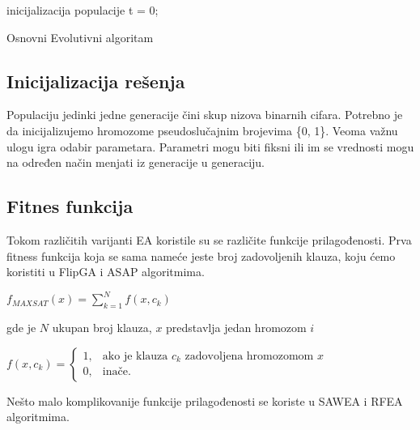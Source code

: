 \documentclass{article}
\begin{document}
\begin{algorithm}[H]
\SetAlgoLined
{}

\BlankLine
 inicijalizacija populacije\;
 t = 0; \\
\caption{Osnovni Evolutivni algoritam}
\end{algorithm}

\subsection{Inicijalizacija rešenja}
\label{sec:ea_init}

Populaciju jedinki jedne generacije čini skup nizova binarnih cifara.
Potrebno je da inicijalizujemo hromozome pseudoslučajnim brojevima \{0, 1\}. Veoma važnu ulogu igra odabir parametara.  Parametri mogu biti fiksni ili im se vrednosti mogu na određen način menjati iz generacije u generaciju.

\subsection{Fitnes funkcija}
\label{sec:ea_fitness}

Tokom različitih varijanti EA koristile su se različite funkcije prilagođenosti. Prva fitness funkcija koja se sama nameće jeste broj zadovoljenih klauza, koju ćemo koristiti u FlipGA i ASAP algoritmima.

	\begin{center}
	$ f_{MAXSAT} (x) = \sum_{k=1}^{N} f(x, c_k) $
	\end{center} 
	
gde je $N$ ukupan broj klauza, $x$ predstavlja jedan hromozom $i$

	\begin{center}
	$ f(x, c_k) = \begin{cases} 1, & \mbox{ako je klauza } c_k \mbox{ zadovoljena hromozomom } x \\ 0, & \mbox{inače.} \end{cases} $
	\end{center}
	
Nešto malo komplikovanije funkcije prilagođenosti se koriste u SAWEA i RFEA algoritmima.
\end{document}
